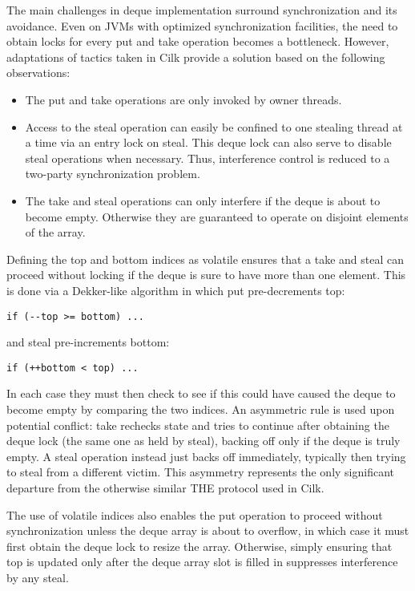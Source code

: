 The main challenges in deque implementation surround synchronization
and its avoidance. Even on JVMs with optimized synchronization
facilities, the need to obtain locks for every put and take operation
becomes a bottleneck.  However, adaptations of tactics taken in Cilk
\cite{Frigo1998} provide a solution based on the following
observations:

\begin{itemize}
\item The put and take operations are only invoked by owner threads.
\item Access to the steal operation can easily be confined to one
  stealing thread at a time via an entry lock on steal. This deque
  lock can also serve to disable steal operations when
  necessary. Thus, interference control is reduced to a two-party
  synchronization problem.
\item The take and steal operations can only interfere if the deque is
  about to become empty. Otherwise they are guaranteed to operate on
  disjoint elements of the array.
\end{itemize}

Defining the top and bottom indices as volatile ensures that a take
and steal can proceed without locking if the deque is sure to have
more than one element. This is done via a Dekker-like algorithm in
which put pre-decrements top:

\begin{lstlisting}
if (--top >= bottom) ...
\end{lstlisting}

and steal pre-increments bottom:

\begin{lstlisting}
if (++bottom < top) ...
\end{lstlisting}

In each case they must then check to see if this could have caused the
deque to become empty by comparing the two indices. An asymmetric rule
is used upon potential conflict: take rechecks state and tries to
continue after obtaining the deque lock (the same one as held by
steal), backing off only if the deque is truly empty. A steal
operation instead just backs off immediately, typically then trying to
steal from a different victim. This asymmetry represents the only
significant departure from the otherwise similar THE protocol used in
Cilk.

The use of volatile indices also enables the put operation to proceed
without synchronization unless the deque array is about to overflow,
in which case it must first obtain the deque lock to resize the
array. Otherwise, simply ensuring that top is updated only after the
deque array slot is filled in suppresses interference by any steal.


